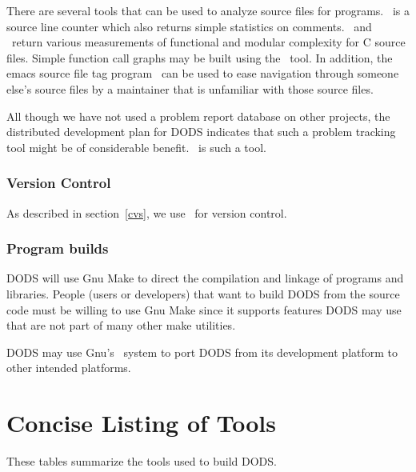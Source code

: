 There are several tools that can be used to analyze source files for
programs. \kdsi\ is a source line counter which also returns simple statistics
on comments. \halstead\ and \mccabe\ return various measurements of functional
and modular complexity for C source files. Simple function call graphs may be
built using the \calls\ tool. In addition, the emacs source file tag program
\etags\ can be used to ease navigation through someone else's source files by a
maintainer that is unfamiliar with those source files.

All though we have not used a problem report database on other projects, the
distributed development plan for DODS indicates that such a problem tracking
tool might be of considerable benefit. \gnats\ is such a tool.

\subsubsection{Version Control}

As described in section~\ref{cvs}, we use \cvs\ for version control.

\subsubsection{Program builds}

DODS will use Gnu Make to direct the compilation and linkage of programs and
libraries. People (users or developers) that want to build DODS from the
source code must be willing to use Gnu Make since it supports features DODS
may use that are not part of many other make utilities. 

DODS may use Gnu's \autoconf\ system to port DODS from its development platform
to other intended platforms.

\section{Concise Listing of Tools}

These tables summarize the tools used to build DODS.

